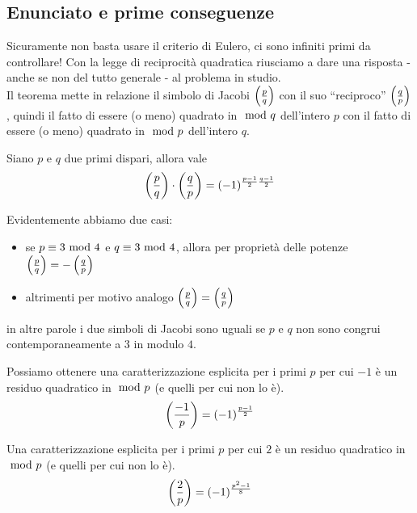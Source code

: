 \subsection{Enunciato e prime conseguenze}
Sicuramente non basta usare il criterio di Eulero, ci sono infiniti primi da controllare! Con la legge di reciprocità quadratica riusciamo a dare una risposta - anche se non del tutto generale - al problema in studio. \\ Il teorema mette in relazione il simbolo di Jacobi  $\left(\frac{p}{q}\right)$ con il suo \enquote{reciproco} $\left(\frac{q}{p}\right)$, quindi il fatto di essere (o meno) quadrato in $\ \mathrm{mod}\ q$ dell'intero $p$ con il fatto di essere (o meno) quadrato in $\ \mathrm{mod}\ p$ dell'intero $q$. 
\begin{teorema}
	Siano $p$ e $q$ due primi dispari, allora vale
	\begin{equation*}
	\left(\frac{p}{q}\right)\cdot\left(\frac{q}{p}\right)=(-1)^{\frac{p-1}{2}\frac{q-1}{2}}
	\end{equation*}
\end{teorema}
\begin{osservazione} 
	Evidentemente abbiamo due casi:
	\begin{itemize}
		\item se $p\equiv3\ \mathrm{mod}\ 4$ e $q\equiv3\ \mathrm{mod}\ 4$, allora per proprietà delle potenze $\left(\frac{p}{q}\right)=-\left(\frac{q}{p}\right)$
		\item altrimenti per motivo analogo $\left(\frac{p}{q}\right)=\left(\frac{q}{p}\right)$
	\end{itemize}
	in altre parole i due simboli di Jacobi sono uguali se $p$ e $q$ non sono congrui contemporaneamente a $3$ in modulo $4$. 
\end{osservazione}
\begin{corollario}
	Possiamo ottenere una caratterizzazione esplicita per i primi $p$ per cui $-1$ è un residuo quadratico in $\ \mathrm{mod}\ p$ (e quelli per cui non lo è).
	\begin{equation*}
	\left(\frac{-1}{p}\right)=(-1)^{\frac{p-1}{2}}
	\end{equation*}
\end{corollario}
\begin{corollario}
	Una caratterizzazione esplicita per i primi $p$ per cui $2$ è un residuo quadratico in $\ \mathrm{mod}\ p$ (e quelli per cui non lo è).
	\begin{equation*}
	\left(\frac{2}{p}\right)=(-1)^{\frac{p^2-1}{8}}
	\end{equation*}
\end{corollario}
